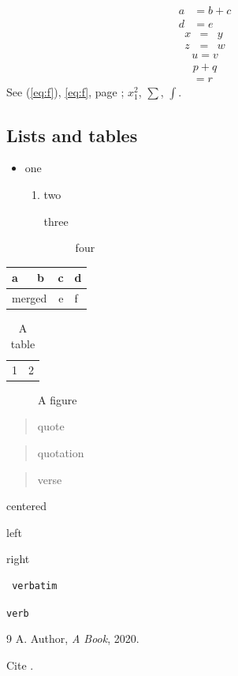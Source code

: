 \begin{align} a &= b + c \\ d &= e \tag{*} \end{align}
\begin{eqnarray} x &=& y \nonumber \\ z &=& w \end{eqnarray}
\begin{gather} u=v \end{gather}
\begin{multline} p+q \\ =r \end{multline}
See (\ref{eq:f}), \eqref{eq:f}, page \pageref{eq:f}; $x_{\scriptscriptstyle 1}^{\scriptstyle 2}$, $\displaystyle\sum$, $\textstyle\int$.

\subsection{Lists and tables}
\begin{itemize}\item one \begin{enumerate}\item two \begin{description}\item[three] four\end{description}\end{enumerate}\end{itemize}
\begin{tabular}{|l|c|r|p{3cm}|}\hline a & b & c & d \\ \hline \multicolumn{2}{|c|}{merged} & e & f \\ \hline\end{tabular}
\begin{table}[ht]\centering\begin{tabular}{cc} 1 & 2 \end{tabular}\caption{A table}\end{table}
\begin{figure}[ht]\centering\fbox{\rule{1cm}{1cm}}\caption{A figure}\end{figure}
\begin{quote} quote \end{quote} \begin{quotation} quotation \end{quotation} \begin{verse} verse \end{verse}
\begin{center} centered \end{center} \begin{flushleft} left \end{flushleft} \begin{flushright} right \end{flushright}
\begin{verbatim} verbatim \end{verbatim} \verb|verb|
\begin{thebibliography}{9} A. Author, \emph{A Book}, 2020.\end{thebibliography}
Cite \cite{k}.

